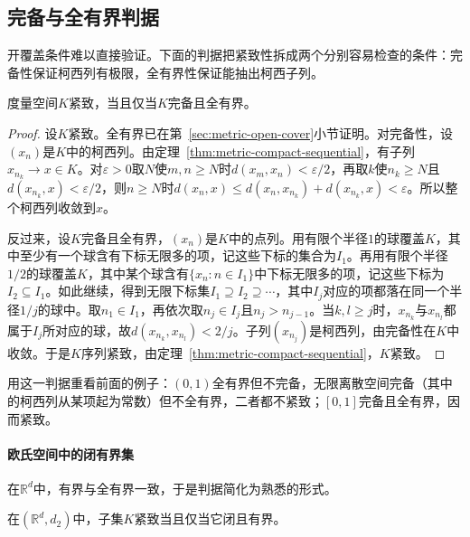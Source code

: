 \subsection{完备与全有界判据}
\label{sec:metric-complete-totally-bounded}

开覆盖条件难以直接验证。下面的判据把紧致性拆成两个分别容易检查的条件：完备性保证柯西列有极限，全有界性保证能抽出柯西子列。

\begin{theorem}[紧致的完备全有界判据]
\label{thm:metric-compact-complete-tb}
度量空间$K$紧致，当且仅当$K$完备且全有界。
\end{theorem}

\begin{proof}
设$K$紧致。全有界已在第~\ref{sec:metric-open-cover}小节证明。对完备性，设$(x_n)$是$K$中的柯西列。由定理~\ref{thm:metric-compact-sequential}，有子列$x_{n_k}\to x\in K$。对$\varepsilon>0$取$N$使$m,n\geq N$时$d(x_m,x_n)<\varepsilon/2$，再取$k$使$n_k\geq N$且$d(x_{n_k},x)<\varepsilon/2$，则$n\geq N$时$d(x_n,x)\leq d(x_n,x_{n_k})+d(x_{n_k},x)<\varepsilon$。所以整个柯西列收敛到$x$。

反过来，设$K$完备且全有界，$(x_n)$是$K$中的点列。用有限个半径$1$的球覆盖$K$，其中至少有一个球含有下标无限多的项，记这些下标的集合为$I_1$。再用有限个半径$1/2$的球覆盖$K$，其中某个球含有$\{x_n:n\in I_1\}$中下标无限多的项，记这些下标为$I_2\subseteq I_1$。如此继续，得到无限下标集$I_1\supseteq I_2\supseteq\cdots$，其中$I_j$对应的项都落在同一个半径$1/j$的球中。取$n_1\in I_1$，再依次取$n_j\in I_j$且$n_j>n_{j-1}$。当$k,l\geq j$时，$x_{n_k}$与$x_{n_l}$都属于$I_j$所对应的球，故$d(x_{n_k},x_{n_l})<2/j$。子列$(x_{n_j})$是柯西列，由完备性在$K$中收敛。于是$K$序列紧致，由定理~\ref{thm:metric-compact-sequential}，$K$紧致。
\end{proof}

用这一判据重看前面的例子：$(0,1)$全有界但不完备，无限离散空间完备（其中的柯西列从某项起为常数）但不全有界，二者都不紧致；$[0,1]$完备且全有界，因而紧致。

\paragraph{欧氏空间中的闭有界集}
在$\mathbb R^d$中，有界与全有界一致，于是判据简化为熟悉的形式。

\begin{theorem}[欧氏空间的闭有界判据]
\label{thm:metric-heine-borel}
在$(\mathbb R^d,d_2)$中，子集$K$紧致当且仅当它闭且有界。
\end{theorem}

